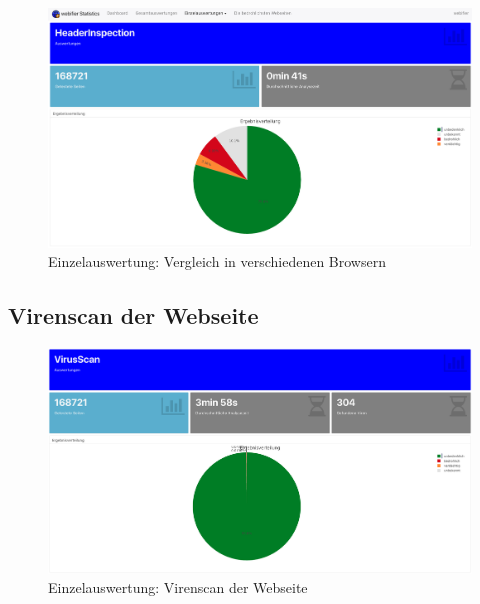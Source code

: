 \begin{figure}[H]
  \centering
  \includegraphics[width=15cm]{images/stats/headerinspection}
  \caption{Einzelauswertung: Vergleich in verschiedenen Browsern\protect\footnotemark}
  \label{fig:headerinspection}
\end{figure}


\subsection{Virenscan der Webseite}
\begin{figure}[H]
  \centering
  \includegraphics[width=15cm]{images/stats/virusscan}
  \caption{Einzelauswertung: Virenscan der Webseite\protect\footnotemark}
  \label{fig:virusscan}
\end{figure}

